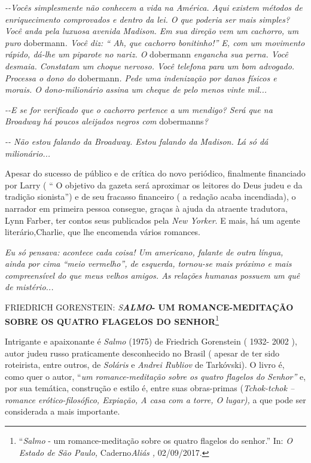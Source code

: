 \emph{-\/-Vocês simplesmente não conhecem a vida na América. Aqui
existem métodos de enriquecimento comprovados e dentro da lei. O que
poderia ser mais simples? Você anda pela luxuosa avenida Madison. Em sua
direção vem um cachorro, um puro} dobermann\emph{. Você diz: `` Ah, que
cachorro bonitinho!'' E, com um movimento rápido, dá-lhe um piparote no
nariz. O} dobermann \emph{engancha sua perna. Você desmaia. Constatam um
choque nervoso. Você telefona para um bom advogado. Processa o dono do}
dobermann\emph{. Pede uma indenização por danos físicos e morais. O
dono-milionário assina um cheque de pelo menos vinte mil...}

\emph{-\/-E se for verificado que o cachorro pertence a um mendigo? Será
que na Broadway há poucos aleijados negros com} dobermanns\emph{?}

\emph{-\/- Não estou falando da Broadway. Estou falando da Madison. Lá
só dá milionário...}

Apesar do sucesso de público e de crítica do novo periódico, finalmente
financiado por Larry ( `` O objetivo da gazeta será aproximar os
leitores do Deus judeu e da tradição sionista'') e de seu fracasso
financeiro ( a redação acaba incendiada), o narrador em primeira pessoa
consegue, graças à ajuda da atraente tradutora, Lynn Farber, ter contos
seus publicados pela \emph{New Yorker}. E mais, há um agente
literário,Charlie, que lhe encomenda vários romances.

\protect\hypertarget{ddelink__16933_1485881000}{}{}\emph{Eu só pensava:
acontece cada coisa! Um americano, falante de outra língua, ainda por
cima ``meio vermelho'', de esquerda, tornou-se mais próximo e mais
compreensível do que meus velhos amigos. As relações humanas possuem um
quê de mistério...}

FRIEDRICH GORENSTEIN: \emph{S\textbf{ALMO}}\textbf{- UM
ROMANCE-MEDITAÇÃO SOBRE OS QUATRO FLAGELOS DO SENHOR}\footnote{``\emph{Salmo}
  - um romance-meditação sobre os quatro flagelos do senhor.'' In:
  \emph{O Estado de São Paulo,} Caderno\emph{Aliás ,} 02/09/2017.}

Intrigante e apaixonante é \emph{Salmo} (1975) de Friedrich Gorenstein (
1932- 2002 ), autor judeu russo praticamente desconhecido no Brasil (
apesar de ter sido roteirista, entre outros, de \emph{Soláris} e
\emph{Andrei Rubliov} de Tarkóvski). O livro é, como quer o autor,
``\emph{um romance-meditação sobre os quatro flagelos do Senhor''} e,
por sua temática, construção e estilo é, entre suas obras-primas
(\emph{Tchok-tchok -- romance erótico-filosófico, Expiação, A casa com a
torre, O lugar),} a que pode ser considerada a mais importante.

